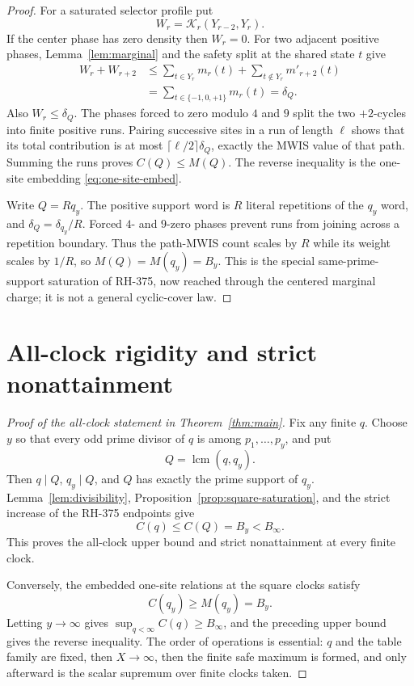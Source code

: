 \documentclass[11pt]{article}
\theoremstyle{definition}
\theoremstyle{remark}
\newcommand{\T}{\{-1,0,+1\}}
\begin{document}
{\begin{proof}
For a saturated selector profile put
\[
 W_r=\mathcal K_r(Y_{r-2},Y_r).
\]
If the center phase has zero density then \(W_r=0\).  For two adjacent
positive phases, Lemma~\ref{lem:marginal} and the safety split at the
shared state \(t\) give
\begin{align*}
 W_r+W_{r+2}
 &\leq\sum_{t\in Y_r}m_r(t)
 +\sum_{t\notin Y_r}m'_{r+2}(t)\\
 &=\sum_{t\in\T}m_r(t)=\delta_Q.
\end{align*}
Also \(W_r\leq\delta_Q\).  The phases forced to zero modulo \(4\) and
\(9\) split the two \(+2\)-cycles into finite positive runs.  Pairing
successive sites in a run of length \(\ell\) shows that its total
contribution is at most
\(\lceil\ell/2\rceil\delta_Q\), exactly the MWIS value of that path.
Summing the runs proves \(C(Q)\leq M(Q)\).  The reverse inequality is the
one-site embedding \eqref{eq:one-site-embed}.

Write \(Q=Rq_y\).  The positive support word is \(R\) literal repetitions
of the \(q_y\) word, and \(\delta_Q=\delta_{q_y}/R\).  Forced \(4\)- and
\(9\)-zero phases prevent runs from joining across a repetition boundary.
Thus the path-MWIS count scales by \(R\) while its weight scales by
\(1/R\), so \(M(Q)=M(q_y)=B_y\).  This is the special same-prime-support
saturation of RH-375, now reached through the centered marginal charge;
it is not a general cyclic-cover law.
\end{proof}

\section{All-clock rigidity and strict nonattainment}

\begin{proof}[Proof of the all-clock statement in Theorem~\ref{thm:main}]
Fix any finite \(q\).  Choose \(y\) so that every odd prime divisor of
\(q\) is among \(p_1,\ldots,p_y\), and put
\[
 Q=\operatorname{lcm}(q,q_y).
\]
Then \(q\mid Q\), \(q_y\mid Q\), and \(Q\) has exactly the prime support
of \(q_y\).  Lemma~\ref{lem:divisibility},
Proposition~\ref{prop:square-saturation}, and the strict increase of the
RH-375 endpoints give
\[
 C(q)\leq C(Q)=B_y<B_\infty.
\]
This proves the all-clock upper bound and strict nonattainment at every
finite clock.

Conversely, the embedded one-site relations at the square clocks satisfy
\[
 C(q_y)\geq M(q_y)=B_y.
\]
Letting \(y\to\infty\) gives
\(\sup_{q<\infty}C(q)\geq B_\infty\), and the preceding upper bound gives
the reverse inequality.  The order of operations is essential: \(q\) and
the table family are fixed, then \(X\to\infty\), then the finite safe
maximum is formed, and only afterward is the scalar supremum over finite
clocks taken.
\end{proof}

}
\end{document}
